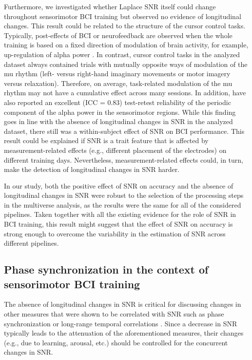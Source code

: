 Furthermore, we investigated whether Laplace SNR itself could change throughout sensorimotor BCI training but observed no evidence of longitudinal changes. This result could be related to the structure of the cursor control tasks. Typically, post-effects of BCI or neurofeedback are observed when the whole training is based on a fixed direction of modulation of brain activity, for example, up-regulation of alpha power \citep{Zoefel2011}. In contrast, cursor control tasks in the analyzed dataset always contained trials with mutually opposite ways of modulation of the mu rhythm (left- versus right-hand imaginary movements or motor imagery versus relaxation). Therefore, on average, task-related modulation of the mu rhythm may not have a cumulative effect across many sessions. In addition, \cite{Popov2023} have also reported an excellent (ICC = 0.83) test-retest reliability of the periodic component of the alpha power in the sensorimotor regions. While this finding goes in line with the absence of longitudinal changes in SNR in the analyzed dataset, there still was a within-subject effect of SNR on BCI performance. This result could be explained if SNR is a trait feature that is affected by measurement-related effects (e.g., different placement of the electrodes) on different training days. Nevertheless, measurement-related effects could, in turn, make the detection of longitudinal changes in SNR harder.

\medskip

In our study, both the positive effect of SNR on accuracy and the absence of longitudinal changes in SNR were robust to the selection of the processing steps in the multiverse analysis, as the results were the same for all of the considered pipelines. Taken together with all the existing evidence for the role of SNR in BCI training, this result might suggest that the effect of SNR on accuracy is strong enough to overcome the variability in the estimation of SNR across different pipelines.

\subsection{Phase synchronization in the context of sensorimotor BCI training}

The absence of longitudinal changes in SNR is critical for discussing changes in other measures that were shown to be correlated with SNR such as phase synchronization or long-range temporal correlations \citep{Samek2016, Vidaurre2020}. Since a decrease in SNR typically leads to the attenuation of the aforementioned measures, their changes (e.g., due to learning, arousal, etc.) should be controlled for the concurrent changes in SNR.

